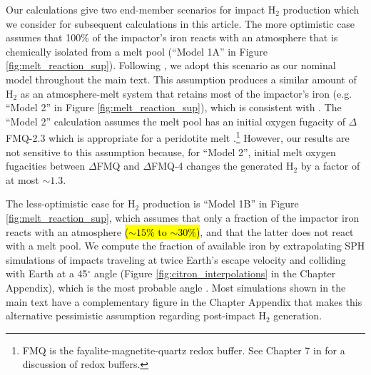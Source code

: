 Our calculations give two end-member scenarios for impact H$_2$ production which we consider for subsequent calculations in this article. The more optimistic case assumes that 100\% of the impactor's iron reacts with an atmosphere that is chemically isolated from a melt pool (``Model 1A'' in Figure \ref{fig:melt_reaction_sup}). Following \citet{Zahnle_2020}, we adopt this scenario as our nominal model throughout the main text. This assumption produces a similar amount of H$_2$ as an atmosphere-melt system that retains most of the impactor's iron (e.g. ``Model 2'' in Figure \ref{fig:melt_reaction_sup}), which is consistent with \citet{Itcovitz_2022}. The ``Model 2'' calculation assumes the melt pool has an initial oxygen fugacity of $\Delta$FMQ-2.3 which is appropriate for a peridotite melt \citep{Itcovitz_2022}.\footnote{FMQ is the fayalite-magnetite-quartz redox buffer. See Chapter 7 in \citet{Catling_2017} for a discussion of redox buffers.} However, our results are not sensitive to this assumption because, for ``Model 2'', initial melt oxygen fugacities between $\Delta$FMQ and $\Delta$FMQ-4 changes the generated H$_2$ by a factor of at most $\sim 1.3$.

The less-optimistic case for H$_2$ production is ``Model 1B'' in Figure \ref{fig:melt_reaction_sup}, which assumes that only a fraction of the impactor iron reacts with an atmosphere \hl{($\sim 15\%$ to $\sim 30\%$)}, and that the latter does not react with a melt pool. We compute the fraction of available iron by extrapolating SPH simulations of impacts traveling at twice Earth's escape velocity and colliding with Earth at a 45$^{\circ}$ angle (Figure \ref{fig:citron_interpolations} in the Chapter Appendix), which is the most probable angle \citep{Citron_2022}. Most simulations shown in the main text have a complementary figure in the Chapter Appendix that makes this alternative pessimistic assumption regarding post-impact H$_2$ generation.

